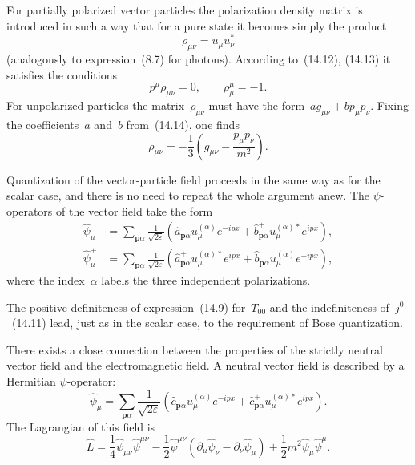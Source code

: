 For partially polarized vector particles the polarization density matrix is introduced in such a way that for a pure state it becomes simply the product
\[
\rho_{\mu\nu} = u_\mu u^*_\nu
\]
(analogously to expression~(8.7) for photons). According to~(14.12), (14.13) it satisfies the conditions
\begin{equation}
p^\mu\rho_{\mu\nu} = 0, \qquad \rho^\mu_\mu = -1.
\tag{14.14}
\end{equation}
For unpolarized particles the matrix~$\rho_{\mu\nu}$ must have the form~$ag_{\mu\nu} + bp_\mu p_\nu$. Fixing the coefficients~$a$ and~$b$ from~(14.14), one finds
\begin{equation}
\rho_{\mu\nu} = -\frac{1}{3}\left(g_{\mu\nu} - \frac{p_\mu p_\nu}{m^2}\right).
\tag{14.15}
\end{equation}

Quantization of the vector-particle field proceeds in the same way as for the scalar case, and there is no need to repeat the whole argument anew. The $\psi$-operators of the vector field take the form
\begin{equation}
\begin{aligned}
\hat{\psi}_\mu &= \sum_{\mathbf{p}\alpha} \frac{1}{\sqrt{2\varepsilon}} \left(\hat{a}_{\mathbf{p}\alpha} u^{(\alpha)}_\mu e^{-ipx} + \hat{b}^+_{\mathbf{p}\alpha} u^{(\alpha)*}_\mu e^{ipx}\right),\\[6pt]
\hat{\psi}^+_\mu &= \sum_{\mathbf{p}\alpha} \frac{1}{\sqrt{2\varepsilon}} \left(\hat{a}^+_{\mathbf{p}\alpha} u^{(\alpha)*}_\mu e^{ipx} + \hat{b}_{\mathbf{p}\alpha} u^{(\alpha)}_\mu e^{-ipx}\right),
\end{aligned}
\tag{14.16}
\end{equation}
where the index~$\alpha$ labels the three independent polarizations.

The positive definiteness of expression~(14.9) for~$T_{00}$ and the indefiniteness of~$j^0$~(14.11) lead, just as in the scalar case, to the requirement of Bose quantization.

There exists a close connection between the properties of the strictly neutral vector field and the electromagnetic field. A neutral vector field is described by a Hermitian $\psi$-operator:
\begin{equation}
\hat{\psi}_\mu = \sum_{\mathbf{p}\alpha} \frac{1}{\sqrt{2\varepsilon}} \left(\hat{c}_{\mathbf{p}\alpha} u^{(\alpha)}_\mu e^{-ipx} + \hat{c}^+_{\mathbf{p}\alpha} u^{(\alpha)*}_\mu e^{ipx}\right).
\tag{14.17}
\end{equation}
The Lagrangian of this field is
\begin{equation}
\hat{L} = \frac{1}{4}\hat{\psi}_{\mu\nu}\hat{\psi}^{\mu\nu} - \frac{1}{2}\hat{\psi}^{\mu\nu}(\partial_\mu\hat{\psi}_\nu - \partial_\nu\hat{\psi}_\mu) + \frac{1}{2}m^2\hat{\psi}_\mu\hat{\psi}^\mu.
\tag{14.18}
\end{equation}

